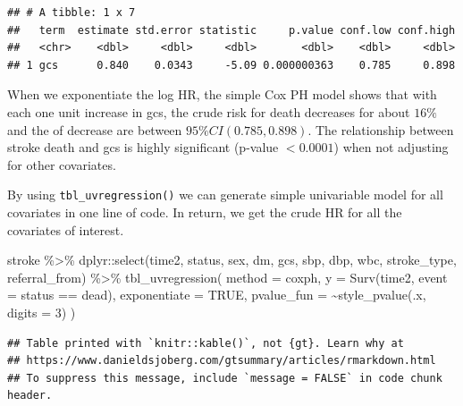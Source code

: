 \documentclass[
  10pt,
]{krantz}
\newenvironment{Shaded}{\begin{snugshade}}{\end{snugshade}}
\newcommand{\AttributeTok}[1]{\textcolor[rgb]{0.77,0.63,0.00}{#1}}
\newcommand{\ConstantTok}[1]{\textcolor[rgb]{0.00,0.00,0.00}{#1}}
\newcommand{\DecValTok}[1]{\textcolor[rgb]{0.00,0.00,0.81}{#1}}
\newcommand{\FunctionTok}[1]{\textcolor[rgb]{0.00,0.00,0.00}{#1}}
\newcommand{\NormalTok}[1]{#1}
\newcommand{\SpecialCharTok}[1]{\textcolor[rgb]{0.00,0.00,0.00}{#1}}
\newcommand{\StringTok}[1]{\textcolor[rgb]{0.31,0.60,0.02}{#1}}
\begin{document}
\begin{verbatim}
## # A tibble: 1 x 7
##   term  estimate std.error statistic     p.value conf.low conf.high
##   <chr>    <dbl>     <dbl>     <dbl>       <dbl>    <dbl>     <dbl>
## 1 gcs      0.840    0.0343     -5.09 0.000000363    0.785     0.898
\end{verbatim}

When we exponentiate the log HR, the simple Cox PH model shows that with each one unit increase in gcs, the crude risk for death decreases for about \(16\%\) and the of decrease are between \(95\% CI (0.785, 0.898)\). The relationship between stroke death and gcs is highly significant (p-value \(< 0.0001\)) when not adjusting for other covariates.

By using \texttt{tbl\_uvregression()} we can generate simple univariable model for all covariates in one line of code. In return, we get the crude HR for all the covariates of interest.

\begin{Shaded}
\begin{Highlighting}[]
\NormalTok{stroke }\SpecialCharTok{\%\textgreater{}\%}
\NormalTok{  dplyr}\SpecialCharTok{::}\FunctionTok{select}\NormalTok{(time2, status, sex, dm, gcs, sbp, dbp, wbc, stroke\_type, referral\_from) }\SpecialCharTok{\%\textgreater{}\%}
  \FunctionTok{tbl\_uvregression}\NormalTok{(}
    \AttributeTok{method =}\NormalTok{ coxph,}
    \AttributeTok{y =} \FunctionTok{Surv}\NormalTok{(time2, }\AttributeTok{event =}\NormalTok{ status }\SpecialCharTok{==} \StringTok{\textquotesingle{}dead\textquotesingle{}}\NormalTok{),}
    \AttributeTok{exponentiate =} \ConstantTok{TRUE}\NormalTok{,}
    \AttributeTok{pvalue\_fun =} \SpecialCharTok{\textasciitilde{}}\FunctionTok{style\_pvalue}\NormalTok{(.x, }\AttributeTok{digits =} \DecValTok{3}\NormalTok{)}
\NormalTok{  ) }
\end{Highlighting}
\end{Shaded}

\begin{verbatim}
## Table printed with `knitr::kable()`, not {gt}. Learn why at
## https://www.danieldsjoberg.com/gtsummary/articles/rmarkdown.html
## To suppress this message, include `message = FALSE` in code chunk header.
\end{verbatim}
\end{document}

